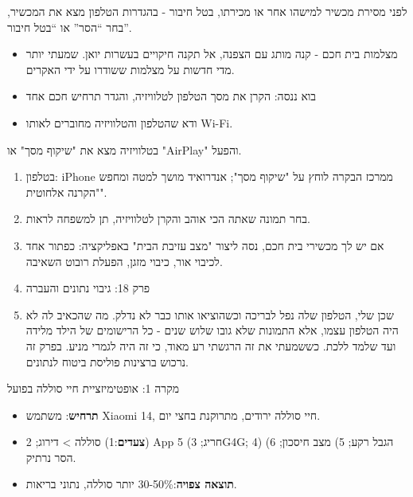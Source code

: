 
לפני מסירת מכשיר למישהו אחר או מכירתו, בטל חיבור - בהגדרות הטלפון מצא את המכשיר, בחר “הסר” או “בטל חיבור”.

\begin{itemize}
  \item מצלמות בית חכם - קנה מותג עם הצפנה, אל תקנה חיקויים בעשרות יואן. שמעתי יותר מדי חדשות על מצלמות ששודרו על ידי האקרים.
  \item בוא ננסה: הקרן את מסך הטלפון לטלוויזיה, והגדר תרחיש חכם אחד
  \item ודא שהטלפון והטלוויזיה מחוברים לאותו Wi-Fi.
\end{itemize}

\begin{tcbpractice}{בטלוויזיה מצא את "שיקוף מסך" או "AirPlay" והפעל.}
\begin{enumerate}
  \item בטלפון: iPhone ממרכז הבקרה לוחץ על "שיקוף מסך"; אנדרואיד מושך למטה ומחפש "הקרנה אלחוטית".
  \item בחר תמונה שאתה הכי אוהב והקרן לטלוויזיה, תן למשפחה לראות.
  \item אם יש לך מכשירי בית חכם, נסה ליצור "מצב עזיבת הבית" באפליקציה: כפתור אחד לכיבוי אור, כיבוי מזגן, הפעלת רובוט השאיבה.
  \item פרק 18: גיבוי נתונים והעברה
  \item שכן שלי, הטלפון שלה נפל לבריכה וכשהוציאו אותו כבר לא נדלק. מה שהכאיב לה לא היה הטלפון עצמו, אלא התמונות שלא גובו שלוש שנים - כל הרישומים של הילד מלידה ועד שלמד ללכת. כששמעתי את זה הרגשתי רע מאוד, כי זה היה לגמרי מניע. בפרק זה נרכוש ברצינות פוליסת ביטוח לנתונים.
\end{enumerate}

\end{tcbpractice}

\begin{tcbinfo}{מקרה 1: אופטימיזציית חיי סוללה בפועל}
\begin{itemize}
  \item \textbf{תרחיש}: משתמש Xiaomi 14, חיי סוללה ירודים, מתרוקנת בחצי יום.
  \item \textbf{צעדים}:1) סוללה > דירוג; 2) App חריג; 3) 5G4G; 4) הגבל רקע; 5) מצב חיסכון; 6) הסר נרתיק.
  \item \textbf{תוצאה צפויה}:30-50\% יותר סוללה, נתוני בריאות.
\end{itemize}

\end{tcbinfo}
